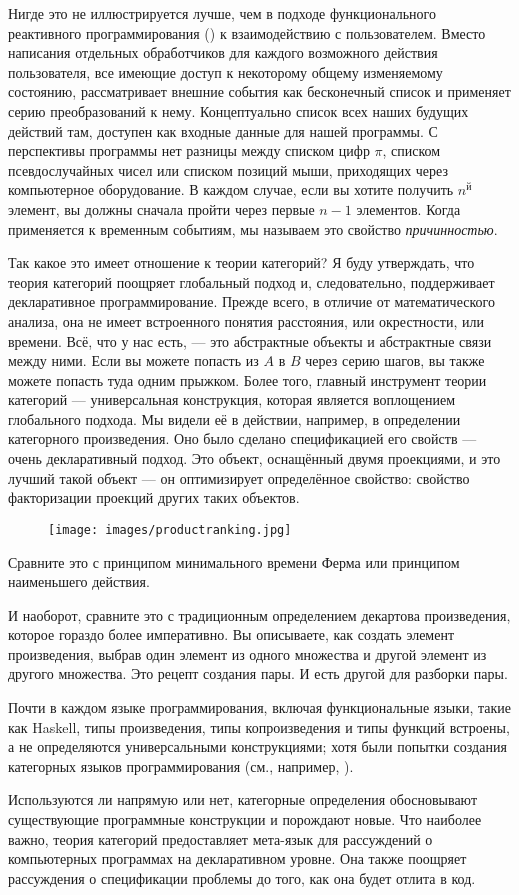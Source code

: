 Нигде это не иллюстрируется лучше, чем в подходе функционального реактивного
программирования () к взаимодействию с пользователем. Вместо написания отдельных
обработчиков для каждого возможного действия пользователя, все имеющие доступ к некоторому
общему изменяемому состоянию,  рассматривает внешние события как бесконечный список
и применяет серию преобразований к нему. Концептуально список
всех наших будущих действий там, доступен как входные данные для нашей
программы. С перспективы программы нет разницы между
списком цифр $\pi$, списком псевдослучайных чисел или списком позиций мыши,
приходящих через компьютерное оборудование. В каждом случае, если вы хотите
получить $n^\text{й}$ элемент, вы должны сначала пройти через первые $n-1$ элементов. Когда
применяется к временным событиям, мы называем это свойство \emph{причинностью}.

Так какое это имеет отношение к теории категорий? Я буду утверждать, что
теория категорий поощряет глобальный подход и, следовательно, поддерживает
декларативное программирование. Прежде всего, в отличие от математического анализа, она не имеет
встроенного понятия расстояния, или окрестности, или времени. Всё, что у нас есть, ---
это абстрактные объекты и абстрактные связи между ними. Если вы можете попасть
из $A$ в $B$ через серию шагов, вы также можете попасть туда одним
прыжком. Более того, главный инструмент теории категорий --- универсальная
конструкция, которая является воплощением глобального подхода. Мы видели её
в действии, например, в определении категорного произведения.
Оно было сделано спецификацией его свойств --- очень декларативный
подход. Это объект, оснащённый двумя проекциями, и это
лучший такой объект --- он оптимизирует определённое свойство: свойство
факторизации проекций других таких объектов.

\begin{figure}[H]
  \centering
  \texttt{[image: images/productranking.jpg]}
\end{figure}

\noindent
Сравните это с принципом минимального времени Ферма или принципом
наименьшего действия.

И наоборот, сравните это с традиционным определением декартова
произведения, которое гораздо более императивно. Вы описываете, как создать
элемент произведения, выбрав один элемент из одного множества и другой
элемент из другого множества. Это рецепт создания пары. И есть
другой для разборки пары.

Почти в каждом языке программирования, включая функциональные языки,
такие как Haskell, типы произведения, типы копроизведения и типы функций
встроены, а не определяются универсальными конструкциями; хотя
были попытки создания категорных языков программирования
(см., например,
).

Используются ли напрямую или нет, категорные определения обосновывают
существующие программные конструкции и порождают новые. Что наиболее
важно, теория категорий предоставляет мета-язык для рассуждений
о компьютерных программах на декларативном уровне. Она также поощряет
рассуждения о спецификации проблемы до того, как она будет отлита в код.
